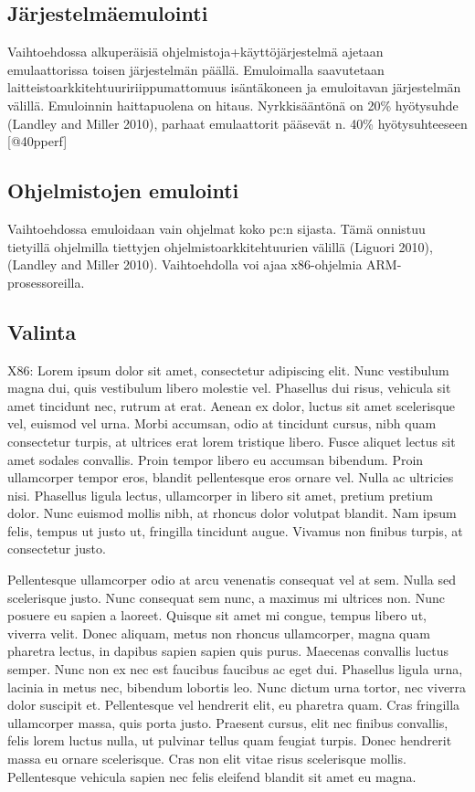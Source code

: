 \documentclass[]{article}
\begin{document}
\subsection{Järjestelmäemulointi}\label{juxe4rjestelmuxe4emulointi}

Vaihtoehdossa alkuperäisiä ohjelmistoja+käyttöjärjestelmä ajetaan
emulaattorissa toisen järjestelmän päällä. Emuloimalla saavutetaan
laitteistoarkkitehtuuririippumattomuus isäntäkoneen ja emuloitavan
järjestelmän välillä. Emuloinnin haittapuolena on hitaus. Nyrkkisääntönä
on 20\% hyötysuhde (Landley and Miller 2010), parhaat emulaattorit
pääsevät n. 40\% hyötysuhteeseen {[}@40pperf{]}

\subsection{Ohjelmistojen emulointi}\label{ohjelmistojen-emulointi}

Vaihtoehdossa emuloidaan vain ohjelmat koko pc:n sijasta. Tämä onnistuu
tietyillä ohjelmilla tiettyjen ohjelmistoarkkitehtuurien välillä
(Liguori 2010),(Landley and Miller 2010). Vaihtoehdolla voi ajaa
x86-ohjelmia ARM-prosessoreilla.

\subsection{Valinta}\label{valinta}

X86: Lorem ipsum dolor sit amet, consectetur adipiscing elit. Nunc
vestibulum magna dui, quis vestibulum libero molestie vel. Phasellus dui
risus, vehicula sit amet tincidunt nec, rutrum at erat. Aenean ex dolor,
luctus sit amet scelerisque vel, euismod vel urna. Morbi accumsan, odio
at tincidunt cursus, nibh quam consectetur turpis, at ultrices erat
lorem tristique libero. Fusce aliquet lectus sit amet sodales convallis.
Proin tempor libero eu accumsan bibendum. Proin ullamcorper tempor eros,
blandit pellentesque eros ornare vel. Nulla ac ultricies nisi. Phasellus
ligula lectus, ullamcorper in libero sit amet, pretium pretium dolor.
Nunc euismod mollis nibh, at rhoncus dolor volutpat blandit. Nam ipsum
felis, tempus ut justo ut, fringilla tincidunt augue. Vivamus non
finibus turpis, at consectetur justo.

Pellentesque ullamcorper odio at arcu venenatis consequat vel at sem.
Nulla sed scelerisque justo. Nunc consequat sem nunc, a maximus mi
ultrices non. Nunc posuere eu sapien a laoreet. Quisque sit amet mi
congue, tempus libero ut, viverra velit. Donec aliquam, metus non
rhoncus ullamcorper, magna quam pharetra lectus, in dapibus sapien
sapien quis purus. Maecenas convallis luctus semper. Nunc non ex nec est
faucibus faucibus ac eget dui. Phasellus ligula urna, lacinia in metus
nec, bibendum lobortis leo. Nunc dictum urna tortor, nec viverra dolor
suscipit et. Pellentesque vel hendrerit elit, eu pharetra quam. Cras
fringilla ullamcorper massa, quis porta justo. Praesent cursus, elit nec
finibus convallis, felis lorem luctus nulla, ut pulvinar tellus quam
feugiat turpis. Donec hendrerit massa eu ornare scelerisque. Cras non
elit vitae risus scelerisque mollis. Pellentesque vehicula sapien nec
felis eleifend blandit sit amet eu magna.
\end{document}
